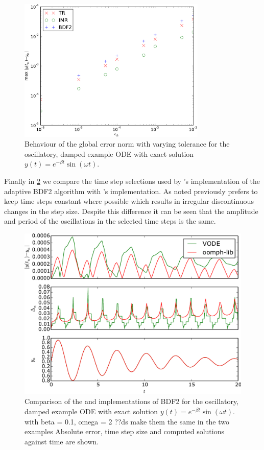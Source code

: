 \begin{figure}
  \centering \includegraphics[width=0.8\textwidth]{plots/aimr_odes/damped_oscillation-maxoferrornormsvs-tol}
  \caption{Behaviour of the global error norm with varying tolerance for the oscillatory, damped example ODE with exact solution $y(t) = e^{-\beta t} \sin(\omega t)$.}
  \label{fig:imr-osc-example-scatter}
\end{figure}

Finally in \cref{fig:vode-osc-example} we compare the time step selections used by \oomph's implementation of the adaptive BDF2 algorithm with \vode's implementation.
As noted previously \vode prefers to keep time steps constant where possible which results in irregular discontinuous changes in the step size.
Despite this difference it can be seen that the amplitude and period of the oscillations in the selected time steps is the same.
\begin{figure}[ht]
  \centering
  \includegraphics[width=\textwidth]{plots/scipyode/vode-bdf2}
  \caption{Comparison of the \oomph and \vode implementations of BDF2 for the oscillatory, damped example ODE with exact solution $y(t) = e^{-\beta t} \sin(\omega t)$.
with beta = 0.1, omega = 2 ??ds make them the same in the two examples
    Absolute error, time step size and computed solutions against time are shown.}
  \label{fig:vode-osc-example}
\end{figure}


